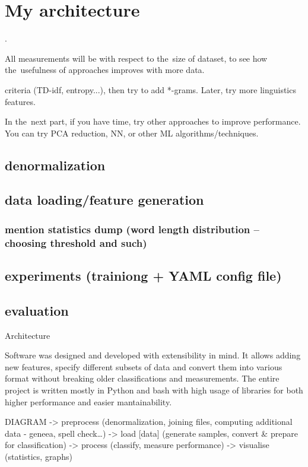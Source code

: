 \chapter{My architecture}
\label{chap:arch}

.

All measurements will be with respect to the~size of dataset, to see how the~usefulness of approaches improves with more data.

criteria (TD-idf, entropy...), then try to add *-grams. Later, try more linguistics features.

In the~next part, if you have time, try other approaches to improve performance. You can try PCA reduction, NN, or other ML algorithms/techniques.

\section{denormalization}

\section{data loading/feature generation}

\subsection{mention statistics dump (word length distribution -- choosing threshold and such)}

\section{experiments (trainiong + YAML config file)}

\section{evaluation}

Architecture

Software was designed and developed with extensibility in mind. It allows adding new features, specify different subsets of data and convert them into various format without breaking older classifications and measurements.
The entire project is written mostly in Python and bash with high usage of libraries for both higher performance and easier mantainability.


DIAGRAM
-> preprocess (denormalization, joining files, computing additional data - geneea, spell check…)
-> load [data] (generate samples, convert \& prepare for classification)
-> process (classify, measure performance)
-> visualise (statistics, graphs)

